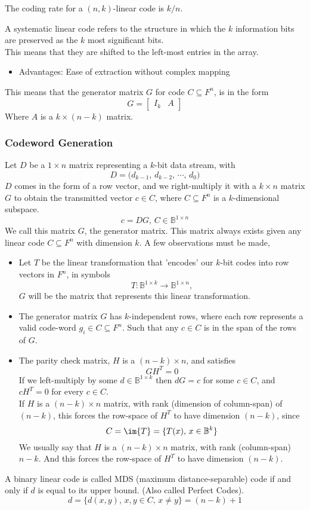 \documentclass[../../main.tex]{subfiles}
\begin{document}
\begin{definition}
    The coding rate for a $(n,k)$-linear code is $k/n$.
\end{definition}
\begin{definition}
    A systematic linear code refers to the structure in which the $k$ information bits are preserved as the $k$ most significant bits.\\
    
    This means that they are shifted to the left-most entries in the array.
    \begin{itemize}
        \item Advantages: Ease of extraction without complex mapping
    \end{itemize}
    This means that the generator matrix $G$ for code $C\subseteq F^n$, is in the form
    \[
    G = \begin{bmatrix}I_k& A\end{bmatrix}
    \]
    Where $A$ is a $k\times (n-k)$ matrix.
\end{definition}

\subsubsection*{Codeword Generation}
Let $D$ be a $1\times n$ matrix representing a $k$-bit data stream, with
\[
D = \biggl(d_{k-1},\,d_{k-2},\,\cdots,\,d_0\biggr)
\]
$D$ comes in the form of a row vector, and we right-multiply it with a $k\times n$ matrix $G$ to obtain the transmitted vector $c\in C$, where $C\subseteq F^n$ is a $k$-dimensional subspace.
\[
c = DG,\,C\in \mathbb{B}^{1\times n}
\]
We call this matrix $G$, the generator matrix. This matrix always exists given any linear code $C\subseteq F^n$ with dimension $k$. A few observations must be made,
\begin{itemize}
    \item Let $T$ be the linear transformation that 'encodes' our $k$-bit codes into row vectors in $F^n$, in symbols
    \[
    T: \mathbb{B}^{1\times k}\to \mathbb{B}^{1\times n},
    \]
    $G$ will be the matrix that represents this linear transformation. 
    \item The generator matrix $G$ has $k$-independent rows, where each row represents a valid code-word $g_i\in C\subseteq F^n$. Such that any $c\in C$ is in the span of the rows of $G$.
    \item The parity check matrix, $H$ is a $(n-k)\times n$, and satisfies
    \[
    GH^T =0
    \]
    If we left-multiply by some $d\in\mathbb{B}^{1\times k}$ then $dG=c$ for some $c\in C$, and $cH^T = 0$ for every $c\in C$.\\
    
    If $H$ is a $(n-k)\times n$ matrix, with rank (dimension of column-span) of $(n-k)$, this forces the row-space of $H^T$ to have dimension $(n-k)$, since 
    \[
    C = \im{T} = \{T(x),\,x\in \mathbb{B}^k\}
    \]
    We usually say that $H$ is a $(n-k)\times n$ matrix, with rank (column-span) $n-k$. And this forces the row-space of $H^T$ to have dimension $(n-k)$. 
\end{itemize}

\begin{definition}
    A binary linear code is called MDS (maximum distance-separable) code if and only if $d$ is equal to its upper bound. (Also called Perfect Codes).
    \[
    d = \{d(x,y),\,x,y\in C,\, x\neq y\} = (n-k) + 1
    \]
\end{definition}
\end{document}

